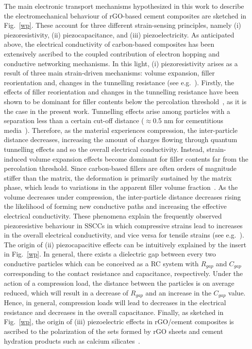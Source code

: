 \documentclass[a4paper,fleqn]{cas-sc}
\begin{document}
The main electronic transport mechanisms hypothesized in this work to describe the electromechanical behaviour of rGO-based cement composites are sketched in Fig.~\ref{wp}. These account for three different strain-sensing principles, namely (i) piezoresistivity, (ii) piezocapacitance, and (iii) piezoelectricity. As anticipated above, the electrical conductivity of carbon-based composites has been extensively ascribed to the coupled contribution of electron hopping and conductive networking mechanisms. In this light, (i) piezoresistivity arises as a result of three main strain-driven mechanisms: volume expansion, filler reorientation and, changes in the tunnelling resistance (see e.g.~\cite{GARMA2016STR}). Firstly, the effects of filler reorientation and changes in the tunnelling resistance have been shown to be dominant for filler contents below the percolation threshold~\cite{GarciaMacias2018}, as it is the case in the present work. Tunnelling effects arise among particles with a separation less than a certain cut-off distance ($\approx$0.5 nm for cementitious media~\cite{xu2010modeling}). Therefore, as the material experiences compression, the inter-particle distance decreases, increasing the amount of charges flowing through quantum tunnelling effects and so the overall electrical conductivity. Instead, strain-induced volume expansion effects become dominant for filler contents far from the percolation threshold. Since carbon-based fillers are often orders of magnitude stiffer than the matrix, the deformation is primarily sustained by the matrix phase, which leads to variations in the apparent filler volume fraction~\cite{Feng2014}. As the volume decreases under compression, the inter-particle distance decreases rising the likelihood of forming new conductive paths and increasing the effective electrical conductivity. These phenomena explain the frequently observed piezoresistive behaviour in SSCCs in which compressive strains lead to increases in the overall electrical conductivity, and vice versa for tensile strains (see e.g.~\cite{madbouly2020evaluating}). The origin of (ii) piezocapacitive effects can be intuitively explained by the insert in Fig.~\ref{wp}. In general, there exists a dielectric gap between every two conductive particles which can be conceived as a RC system with $R_{gap}$ and $C_{gap}$ corresponding to the contact resistance and capacitance, respectively. Under the action of a compression load, the distance between the particles is on average reduced, which will result in a decrease of $R_{gap}$ and an increase in the $C_{gap}$ value. Hence, in general, compression loads will lead to decreases in the electrical resistance and decreases in the overall capacitance. Finally, as sketched in Fig.~\ref{wp}, the origin of (iii) piezoelectric effects in rGO/cement composites is ascribed to the polarization of the sets formed by rGO sheets and cement hydration products such as calcium silicates~\cite{LV2013}. 
\end{document}
